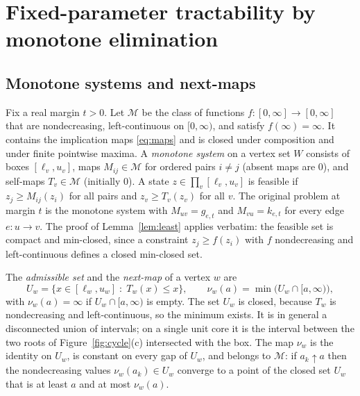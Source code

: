 \documentclass[11pt,a4paper]{article}
\theoremstyle{plain}
\theoremstyle{definition}
\theoremstyle{remark}
\newcommand{\M}{\mathcal{M}}
\begin{document}
\section{Fixed-parameter tractability by monotone elimination}\label{sec:fpt}

\subsection{Monotone systems and next-maps}
Fix a real margin $t>0$. Let $\M$ be the class of functions $f\colon[0,\infty]\to[0,\infty]$ that are nondecreasing, left-continuous on $[0,\infty)$, and satisfy $f(\infty)=\infty$. It contains the implication maps \eqref{eq:maps} and is closed under composition and under finite pointwise maxima. A \emph{monotone system} on a vertex set $W$ consists of boxes $[\ell_v,u_v]$, maps $M_{ij}\in\M$ for ordered pairs $i\ne j$ (absent maps are $0$), and self-maps $T_v\in\M$ (initially $0$). A state $z\in\prod_v[\ell_v,u_v]$ is feasible if $z_j\ge M_{ij}(z_i)$ for all pairs and $z_v\ge T_v(z_v)$ for all $v$. The original problem at margin $t$ is the monotone system with $M_{uv}=g_{e,t}$ and $M_{vu}=k_{e,t}$ for every edge $e\colon u\to v$. The proof of Lemma~\ref{lem:least} applies verbatim: the feasible set is compact and min-closed, since a constraint $z_j\ge f(z_i)$ with $f$ nondecreasing and left-continuous defines a closed min-closed set.

The \emph{admissible set} and the \emph{next-map} of a vertex $w$ are
\begin{equation}\label{eq:nextmap}
  U_w=\{x\in[\ell_w,u_w]\;:\;T_w(x)\le x\},\qquad \nu_w(a)=\min\bigl(U_w\cap[a,\infty)\bigr),
\end{equation}
with $\nu_w(a)=\infty$ if $U_w\cap[a,\infty)$ is empty.
The set $U_w$ is closed, because $T_w$ is nondecreasing and left-continuous, so the minimum exists. It is in general a disconnected union of intervals; on a single unit core it is the interval between the two roots of Figure~\ref{fig:cycle}(c) intersected with the box. The map $\nu_w$ is the identity on $U_w$, is constant on every gap of $U_w$, and belongs to $\M$: if $a_k\uparrow a$ then the nondecreasing values $\nu_w(a_k)\in U_w$ converge to a point of the closed set $U_w$ that is at least $a$ and at most $\nu_w(a)$.
\end{document}
